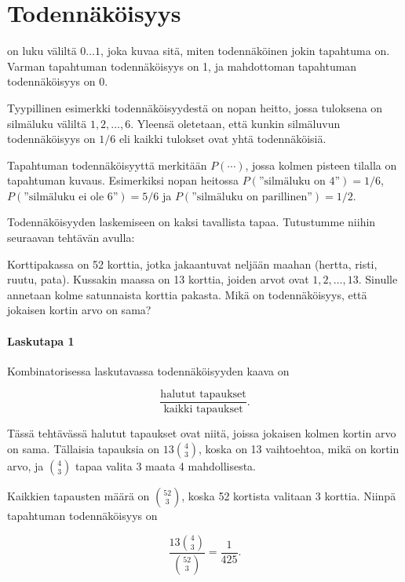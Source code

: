 \chapter{Todennäköisyys}


 on luku väliltä $0 \ldots 1$,
joka kuvaa sitä, miten todennäköinen jokin
tapahtuma on.
Varman tapahtuman todennäköisyys on 1,
ja mahdottoman tapahtuman todennäköisyys on 0.

Tyypillinen esimerkki todennäköisyydestä
on nopan heitto, jossa tuloksena
on silmäluku väliltä $1,2,\ldots,6$.
Yleensä oletetaan, että kunkin silmäluvun
todennäköisyys on $1/6$
eli kaikki tulokset ovat yhtä todennäköisiä.

Tapahtuman todennäköisyyttä merkitään $P(\cdots)$,
jossa kolmen pisteen tilalla on tapahtuman kuvaus.
Esimerkiksi nopan heitossa
$P(\textrm{''silmäluku on 4''})=1/6$,
$P(\textrm{''silmäluku ei ole 6''})=5/6$
ja $P(\textrm{''silmäluku on parillinen''})=1/2$.

Todennäköisyyden laskemiseen on
kaksi tavallista tapaa. Tutustumme niihin
seuraavan tehtävän avulla:

\begin{task}
Korttipakassa on 52 korttia, jotka jakaantuvat
neljään maahan (hertta, risti, ruutu, pata).
Kussakin maassa on 13 korttia, joiden arvot ovat $1,2,\ldots,13$.
Sinulle annetaan kolme satunnaista korttia pakasta.
Mikä on todennäköisyys, että jokaisen kortin arvo on sama?
\end{task}

\subsubsection*{Laskutapa 1}

Kombinatorisessa laskutavassa
todennäköisyyden kaava on

\[\frac{\textrm{halutut tapaukset}}{\textrm{kaikki tapaukset}}.\]

Tässä tehtävässä halutut tapaukset ovat niitä,
joissa jokaisen kolmen kortin arvo on sama.
Tällaisia tapauksia on $13 {4 \choose 3}$,
koska on 13 vaihtoehtoa, mikä on kortin arvo,
ja ${4 \choose 3}$ tapaa valita 3 maata 4 mahdollisesta.

Kaikkien tapausten määrä on ${52 \choose 3}$,
koska 52 kortista valitaan 3 korttia.
Niinpä tapahtuman todennäköisyys on

\[\frac{13 {4 \choose 3}}{{52 \choose 3}} = \frac{1}{425}.\]

